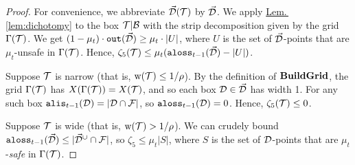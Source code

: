 \documentclass{acmsmall}
\newcommand{\cB}{{\cal B}}
\newcommand{\cD}{{\cal D}}
\newcommand{\cE}{{\cal E}}
\newcommand{\cF}{{\cal F}}
\newcommand{\cT}{{\cal T}}
\newcommand{\Lem}[1]{\hyperref[lem:#1]{Lem.\,\ref*{lem:#1}}} %
\newcommand{\alis}{{\tt alis}}
\newcommand{\aloss}{{\tt aloss}}
\newcommand{\outside}{{\tt out}}
\newcommand{\kappaest}{\widehat{\kappa}}
\newcommand{\strip}[2]{#1|#2}
\newcommand{\width}{{\bf {\rm  w}}}
\newcommand{\errorterm}{\zeta}
\newcommand{\buildgrid}{{\rm {\bf BuildGrid}}}
\begin{document}
\begin{proof} For convenience, we abbreviate $\vec{\cD}(\cT)$ by  $\vec{\cD}$. 
We apply \Lem{dichotomy} to the box $\strip{\cT}{\cB}$ with the strip decomposition given by the grid $\Gamma(\cT)$.
We get $(1-\mu_t)\cdot \outside(\vec{\cD}) \geq \mu_t\cdot|U|$, where $U$ is the set of $\vec{\cD}$-points that 
are $\mu_t$-unsafe in $\Gamma(\cT)$. 
Hence, $\errorterm_5(\cT) \leq \mu_t(\aloss_{t-1}(\vec{\cD}) - |U|)$.

%
%
%

Suppose $\cT$ is narrow (that is, $\width(\cT) \leq 1/\rho$).
By the definition of $\buildgrid$, the grid $\Gamma(\cT)$ has
$X(\Gamma(\cT))=X(\cT)$, and so each box $\cD \in \vec{\cD}$ has width 1. 
For any such box $\alis_{t-1}(\cD)=|\cD \cap \cF|$, so $\aloss_{t-1}(\cD) = 0$.
Hence, $\errorterm_5(\cT) \leq 0$.
%

Suppose $\cT$ is wide (that is, $\width(\cT) > 1/\rho$).
We can crudely bound $\aloss_{t-1}(\vec{\cD}) \leq |\vec{\cD}^\cup \cap \cF|$,
so $\errorterm_5 \leq \mu_t |S|$, where $S$ is the set of $\cD$-points
that are $\mu_t$-\emph{safe} in $\Gamma(\cT)$.
%
%
%


\end{proof}
\end{document}
